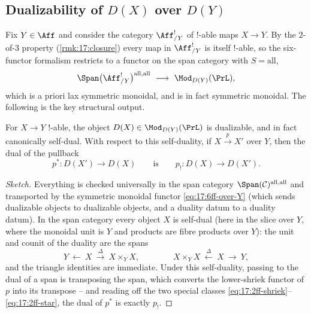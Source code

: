 \subsection{Dualizability of \texorpdfstring{$D(X)$}{D(X)} over \texorpdfstring{$D(Y)$}{D(Y)}}
\label{subsec:17:dualizability}

Fix $Y\in\Aff$ and consider the category $\Aff^{!}_{/Y}$ of $!$-able maps $X\to Y$. By the
$2$-of-$3$ property (\cref{rmk:17:closure}) every map in $\Aff^{!}_{/Y}$ is itself $!$-able,
so the six-functor formalism restricts to a functor on the span category with $S=\mathrm{all}$,
\begin{equation}
\label{eq:17:6ff-over-Y}
\Span\bigl(\Aff^{!}_{/Y}\bigr)^{\mathrm{all},\mathrm{all}}\ \longrightarrow\ \Mod_{D(Y)}(\PrL),
\end{equation}
which is a priori lax symmetric monoidal, and is in fact symmetric monoidal. The
following is the key structural output.

\begin{corollary}
\label{cor:17:self-dual}
For $X\to Y$ $!$-able, the object $D(X)\in\Mod_{D(Y)}(\PrL)$ is dualizable, and in fact
canonically self-dual. With respect to this self-duality, if $X\xrightarrow{p}X'$ over $Y$,
then the dual of the pullback
\begin{equation*}
p^{*}\colon D(X')\to D(X)\qquad\text{is}\qquad p_{!}\colon D(X)\to D(X').
\end{equation*}
\end{corollary}

\begin{proof}[Sketch]
Everything is checked universally in the span category $\Span(\mathcal C)^{\mathrm{all},\mathrm{all}}$
and transported by the symmetric monoidal functor \eqref{eq:17:6ff-over-Y} (which sends
dualizable objects to dualizable objects, and a duality datum to a duality datum). In the span
category every object $X$ is self-dual (here in the slice over $Y$, where the monoidal unit
is $Y$ and products are fibre products over $Y$): the unit and counit of the duality are the
spans
\[
Y\ \leftarrow\ X\ \xrightarrow{\ \Delta\ }\ X\times_{Y}X,\qquad\qquad
X\times_{Y}X\ \xleftarrow{\ \Delta\ }\ X\ \rightarrow\ Y,
\]
and the triangle identities are immediate. Under this self-duality, passing to
the dual of a span is transposing the span, which converts the lower-shriek functor of
$p$ into its transpose -- and reading off the two special classes
\eqref{eq:17:2ff-shriek}--\eqref{eq:17:2ff-star}, the dual of $p^{*}$ is exactly $p_{!}$.
\end{proof}

